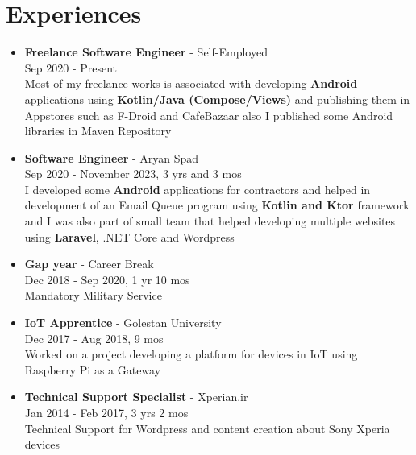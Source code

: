\section*{\LARGE{Experiences}}
\begin{itemize}
    \item \large{\textbf{Freelance Software Engineer} - Self-Employed\\}
    \normalsize{Sep 2020 - Present\\
    Most of my freelance works is associated with developing \textbf{Android} applications using
    \textbf{Kotlin/Java (Compose/Views)} and publishing them in Appstores such as F-Droid and CafeBazaar
    also I published some Android libraries in Maven Repository}
    \item \large{\textbf{Software Engineer} - Aryan Spad\\}
    \normalsize{Sep 2020 - November 2023, 3 yrs and 3 mos\\I developed some \textbf{Android} applications for contractors
    and helped in development of an Email Queue program using \textbf{Kotlin and Ktor} framework
    and I was also part of small team that helped developing multiple websites using \textbf{Laravel}, .NET Core and Wordpress}
    \item \large{\textbf{Gap year} - Career Break\\}\normalsize{Dec 2018 - Sep 2020, 1 yr 10 mos\\ Mandatory Military Service}
    \item \large{\textbf{IoT Apprentice} - Golestan University\\}
    \normalsize{Dec 2017 - Aug 2018, 9 mos\\Worked on a project developing a platform for devices in IoT using Raspberry Pi as a Gateway}
    \item \large{\textbf{Technical Support Specialist} - Xperian.ir\\}
    \normalsize{Jan 2014 - Feb 2017, 3 yrs 2 mos\\Technical Support for Wordpress and content creation about Sony Xperia devices}
\end{itemize}